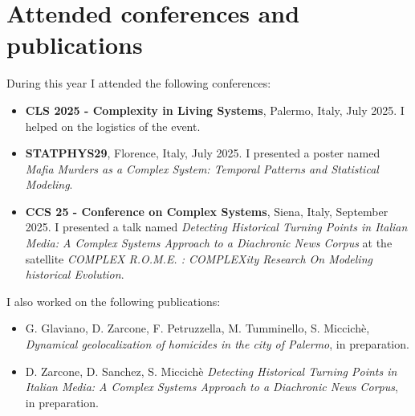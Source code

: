 \section{Attended conferences and publications}

During this year I attended the following conferences:
\begin{itemize}
    \item \textbf{CLS 2025 - Complexity in Living Systems}, Palermo, Italy, July 2025. I helped on the logistics of the event.
    \item \textbf{STATPHYS29}, Florence, Italy, July 2025. I presented a poster named \textit{Mafia Murders as a Complex System: Temporal Patterns and Statistical Modeling}.
    \item \textbf{CCS 25 - Conference on Complex Systems}, Siena, Italy, September 2025. I presented a talk named \textit{Detecting Historical Turning Points in Italian Media: A Complex Systems Approach to a Diachronic News Corpus} at the satellite \textit{COMPLEX R.O.M.E. : COMPLEXity Research On Modeling historical Evolution}.
\end{itemize}

I also worked on the following publications:
\begin{itemize}
    \item G. Glaviano, D. Zarcone, F. Petruzzella, M. Tumminello, S. Miccichè, \textit{Dynamical geolocalization of homicides in the city of Palermo}, in preparation.
    \item D. Zarcone, D. Sanchez, S. Miccichè \textit{Detecting Historical Turning Points in Italian Media: A Complex Systems Approach to a Diachronic News Corpus}, in preparation.
\end{itemize}